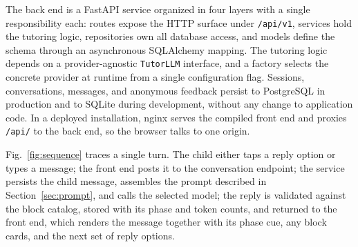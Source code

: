 \documentclass[conference]{IEEEtran}
\begin{document}
The back end is a FastAPI service organized in four layers with a single responsibility each: routes expose the HTTP surface under \texttt{/api/v1}, services hold the tutoring logic, repositories own all database access, and models define the schema through an asynchronous SQLAlchemy mapping. The tutoring logic depends on a provider-agnostic \texttt{TutorLLM} interface, and a factory selects the concrete provider at runtime from a single configuration flag. Sessions, conversations, messages, and anonymous feedback persist to PostgreSQL in production and to SQLite during development, without any change to application code. In a deployed installation, nginx serves the compiled front end and proxies \texttt{/api/} to the back end, so the browser talks to one origin.

Fig.~\ref{fig:sequence} traces a single turn. The child either taps a reply option or types a message; the front end posts it to the conversation endpoint; the service persists the child message, assembles the prompt described in Section~\ref{sec:prompt}, and calls the selected model; the reply is validated against the block catalog, stored with its phase and token counts, and returned to the front end, which renders the message together with its phase cue, any block cards, and the next set of reply options.
\end{document}
